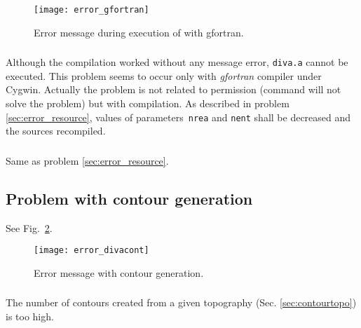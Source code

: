 \begin{figure}[htpb]
\centering
\texttt{[image: error\_gfortran]}
\caption{Error message during execution of  with gfortran\label{fig:error_gfortran}.}
\end{figure}

\subsubsection{\question}

Although the compilation worked without any message error, \texttt{diva.a} cannot be executed. This problem seems to occur only with \textsl{gfortran} compiler under \textsf{Cygwin}. Actually the problem is not related to permission (command  will not solve the problem) but with compilation. As described in problem \ref{sec:error_resource}, values of parameters\, \texttt{nrea} and \texttt{nent} shall be decreased and the sources recompiled.

\subsubsection{\answer}

Same as problem \ref{sec:error_resource}. 




\subsection{Problem with contour generation}

See Fig.~\ref{error:cont}.

\begin{figure}[htpb]
\centering
\texttt{[image: error\_divacont]}
\caption{Error message with contour generation.\label{error:cont}}
\end{figure}

\subsubsection{\question}

The number of contours created from a given topography (Sec. \ref{sec:contourtopo}) is too high. 

\subsubsection{\answer}

